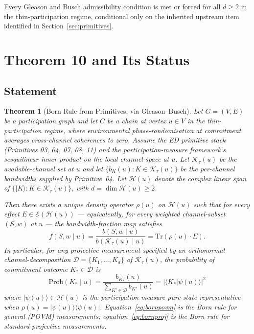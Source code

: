 \documentclass[11pt,a4paper]{article}
\newtheorem{theorem}{Theorem}[section]
\begin{document}
Every Gleason and Busch admissibility condition is met or forced for all $d \geq 2$ in the thin-participation regime, conditional only on the inherited upstream item identified in Section~\ref{sec:primitives}.

\section{Theorem 10 and Its Status}\label{sec:theorem10}

\subsection{Statement}

\begin{theorem}[Born Rule from Primitives, via Gleason--Busch]
Let $G = (V, E)$ be a participation graph and let $C$ be a chain at vertex $u \in V$ in the thin-participation regime, where environmental phase-randomisation at commitment averages cross-channel coherences to zero. Assume the ED primitive stack (Primitives 03, 04, 07, 08, 11) and the participation-measure framework's sesquilinear inner product on the local channel-space at $u$. Let $\mathcal{K}_\tau(u)$ be the available-channel set at $u$ and let $\{b_K(u) : K \in \mathcal{K}_\tau(u)\}$ be the per-channel bandwidths supplied by Primitive~04. Let $\mathcal{H}(u)$ denote the complex linear span of $\{|K\rangle : K \in \mathcal{K}_\tau(u)\}$, with $d = \dim \mathcal{H}(u) \geq 2$.

Then there exists a unique density operator $\rho(u)$ on $\mathcal{H}(u)$ such that for every effect $E \in \mathcal{E}(\mathcal{H}(u))$ --- equivalently, for every weighted channel-subset $(S, w)$ at $u$ --- the bandwidth-fraction map satisfies
\begin{equation}
f(S, w \mid u) = \frac{b(S, w \mid u)}{b(\mathcal{K}_\tau(u) \mid u)} = \mathrm{Tr}(\rho(u) \cdot E).
\label{eq:bornpovm}
\end{equation}
In particular, for any projective measurement specified by an orthonormal channel-decomposition $\mathcal{D} = \{K_1, \ldots, K_d\}$ of $\mathcal{K}_\tau(u)$, the probability of commitment outcome $K_* \in \mathcal{D}$ is
\begin{equation}
\mathrm{Prob}(K_* \mid u) = \frac{b_{K_*}(u)}{\sum_{K' \in \mathcal{D}} b_{K'}(u)} = |\langle K_* | \psi(u) \rangle|^2
\label{eq:bornproj}
\end{equation}
where $|\psi(u)\rangle \in \mathcal{H}(u)$ is the participation-measure pure-state representative when $\rho(u) = |\psi(u)\rangle\langle\psi(u)|$. Equation~\eqref{eq:bornpovm} is the Born rule for general (POVM) measurements; equation~\eqref{eq:bornproj} is the Born rule for standard projective measurements.
\end{theorem}
\end{document}
